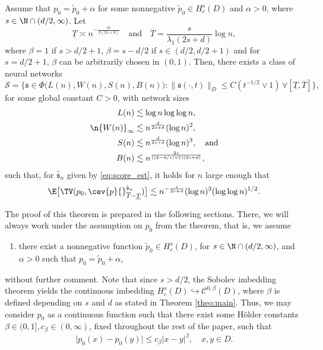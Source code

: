\documentclass[a4paper, 11pt, headings = small, abstract]{scrartcl}
\begin{document}
\begin{theorem} \label{theo:main}
Assume that $p_0 = \tilde{p}_0 + \alpha$ for some nonnegative $\tilde{p}_0 \in H^s_c(D)$ and $\alpha > 0$, where $s \in \N \cap (d/2,\infty)$. Let
\[\underline{T} \asymp  n^{-\frac{2s}{\beta(2s+d)}} \quad \text{and} \quad \overline{T} = \frac{s}{\lambda_1(2s+d)} \log n,\] 
where $\beta = 1$ if $s > d/2+1$, $\beta = s-d/2$ if $s \in (d/2,d/2+1)$ and for $s= d/2+1$, $\beta$ can be arbitrarily chosen in $(0,1)$. 
Then, there exists a class of  neural networks  
\[\mathcal{S} = \big\{\mathfrak{s} \in \Phi\big(L(n),W(n),S(n),B(n)\big): \lVert \mathfrak{s}(\cdot,t)\rVert_D \leq C(t^{-1/2} \vee 1) \, \forall [\underline{T}, \overline{T}] \big\},\] 
for some global constant $C> 0$, with network sizes
\begin{align*}
L(n)
&\lesssim\log n\log\log n, \\
\n{W(n)}_{\infty}
&\lesssim  n^\frac{d}{2s+d}(\log n)^2, \\
S(n)
&\lesssim n^\frac{d}{2s+d}(\log n)^3,\quad\text{and} \\
B(n)
&\lesssim n^{\frac{2s}{((2-d/s)\vee 1)(2s+d)}},
\end{align*}
such that, for $\hat{\mathfrak{s}}_n$ given by \eqref{eq:score_est}, it holds for $n$ large enough that
\begin{equation}\label{eq:conv_rate}
\E\big[\TV(p_0,\cev{p}{}^{\hat{\mathfrak{s}}_n}_{\overline{T}- \underline{T}})\big] \lesssim n^{-\frac{s}{2s+d}} (\log n)^{3} (\log \log n)^{1/2}.
\end{equation}
\end{theorem}
The proof of this theorem is prepared in the following sections. There, we will always work under the assumption on $p_0$ from the theorem, that is, we assume 
\begin{enumerate}[label = ($\mathcal{H}$0), ref = ($\mathcal{H}$0)]
\item there exist a nonnegative function $\tilde{p}_0 \in H^s_c(D)$, for $s \in \N \cap (d/2,\infty)$, and $\alpha > 0$ such that $p_0 = \tilde{p}_0 + \alpha$,
\end{enumerate}
without further comment. Note that since $s > d/2$, the Sobolev imbedding theorem yields the continuous imbedding $H^s_c(D) \hookrightarrow \mathcal{C}^{0,\beta}(D)$, where $\beta$ is defined depending on $s$ and $d$ as stated in Theorem \ref{theo:main}. Thus, we may consider $p_0$ as a continuous function such that there exist some Hölder constants $\beta \in (0,1],c_\beta \in (0,\infty)$, fixed throughout the rest of the paper, such that 
\begin{equation}\label{eq:hoelder}
\lvert p_0(x) - p_0(y) \rvert \leq c_\beta \lvert x - y \rvert^\beta, \quad x,y \in D.
\end{equation}
\end{document}
